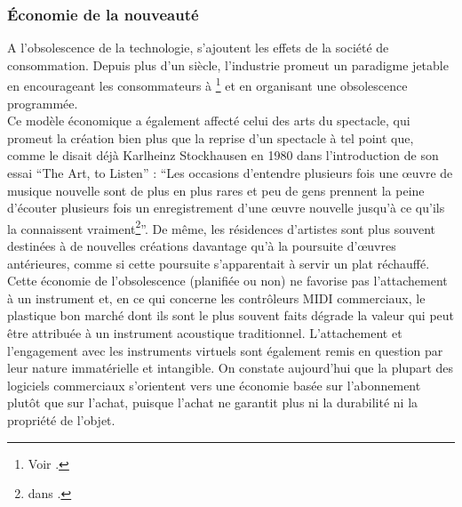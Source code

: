 
\subsubsection{Économie de la nouveauté}

\noindent A l'obsolescence de la technologie, s'ajoutent les effets de la société de consommation. Depuis plus d'un siècle, l'industrie promeut un paradigme jetable en encourageant les consommateurs à \footnote{Voir \cite{slade_made_2006}.} et en organisant une obsolescence programmée.\\
\indent Ce modèle économique a également affecté celui des arts du spectacle, qui promeut la création bien plus que la reprise d'un spectacle à tel point que, comme le disait déjà Karlheinz Stockhausen en 1980 dans l'introduction de son essai ``The Art, to Listen'' : ``Les occasions d'entendre plusieurs fois une œuvre de musique nouvelle sont de plus en plus rares et peu de gens prennent la peine d'écouter plusieurs fois un enregistrement d'une œuvre nouvelle jusqu'à ce qu'ils la connaissent vraiment\footnote{ dans \cite{stockhausen_art_2002}.}''.
De même, les résidences d'artistes sont plus souvent destinées à de nouvelles créations davantage qu'à la poursuite d'œuvres antérieures, comme si cette poursuite s'apparentait à servir un plat réchauffé.\\
\indent Cette économie de l'obsolescence (planifiée ou non) ne favorise pas l'attachement à un instrument et, en ce qui concerne les contrôleurs \gls{MIDI} commerciaux, le plastique bon marché dont ils sont le plus souvent faits dégrade la valeur qui peut être attribuée à un instrument acoustique traditionnel. L'attachement et l'engagement avec les instruments virtuels sont également remis en question par leur nature immatérielle et intangible. On constate aujourd'hui que la plupart des logiciels commerciaux s'orientent vers une économie basée sur l'abonnement plutôt que sur l'achat, puisque l'achat ne garantit plus ni la durabilité ni la propriété de l'objet.

